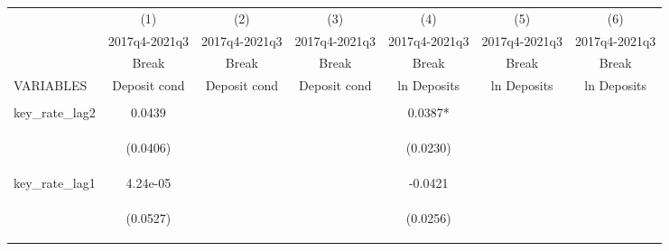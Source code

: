 \documentclass[]{article}
\begin{document}
\begin{center}
\begin{tabular}{lcccccc} \hline
 & (1) & (2) & (3) & (4) & (5) & (6) \\
 & 2017q4-2021q3 & 2017q4-2021q3 & 2017q4-2021q3 & 2017q4-2021q3 & 2017q4-2021q3 & 2017q4-2021q3 \\
 & Break & Break & Break & Break & Break & Break \\
VARIABLES & Deposit cond & Deposit cond & Deposit cond & ln Deposits & ln Deposits & ln Deposits \\ \hline
\vspace{4pt} & \begin{footnotesize}\end{footnotesize} & \begin{footnotesize}\end{footnotesize} & \begin{footnotesize}\end{footnotesize} & \begin{footnotesize}\end{footnotesize} & \begin{footnotesize}\end{footnotesize} & \begin{footnotesize}\end{footnotesize} \\
key\_rate\_lag2 & 0.0439 &  &  & 0.0387* &  &  \\
\vspace{4pt} & \begin{footnotesize}(0.0406)\end{footnotesize} & \begin{footnotesize}\end{footnotesize} & \begin{footnotesize}\end{footnotesize} & \begin{footnotesize}(0.0230)\end{footnotesize} & \begin{footnotesize}\end{footnotesize} & \begin{footnotesize}\end{footnotesize} \\
key\_rate\_lag1 & 4.24e-05 &  &  & -0.0421 &  &  \\
\vspace{4pt} & \begin{footnotesize}(0.0527)\end{footnotesize} & \begin{footnotesize}\end{footnotesize} & \begin{footnotesize}\end{footnotesize} & \begin{footnotesize}(0.0256)\end{footnotesize} & \begin{footnotesize}\end{footnotesize} & \begin{footnotesize}\end{footnotesize} \\

\end{tabular}
\end{center}
\end{document}
